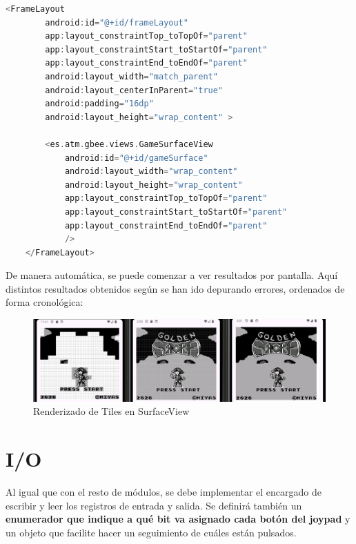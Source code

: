 \begin{lstlisting}[language=Kotlin, caption={GameSurfaceView en Layout.}, label={code:surfacelayout}]
    <FrameLayout
        android:id="@+id/frameLayout"
        app:layout_constraintTop_toTopOf="parent"
        app:layout_constraintStart_toStartOf="parent"
        app:layout_constraintEnd_toEndOf="parent"
        android:layout_width="match_parent"
        android:layout_centerInParent="true"
        android:padding="16dp"
        android:layout_height="wrap_content" >

        <es.atm.gbee.views.GameSurfaceView
            android:id="@+id/gameSurface"
            android:layout_width="wrap_content"
            android:layout_height="wrap_content"
            app:layout_constraintTop_toTopOf="parent"
            app:layout_constraintStart_toStartOf="parent"
            app:layout_constraintEnd_toEndOf="parent"
            />
    </FrameLayout>
\end{lstlisting}
\clearpage
De manera automática, se puede comenzar a ver resultados por pantalla. Aquí distintos resultados obtenidos según se han ido depurando errores, ordenados de forma cronológica:

\begin{figure}[H]
    \centering
    \includegraphics[width=1\textwidth]{include/images/render_surface_view.png}
    \caption{Renderizado de Tiles en SurfaceView}\label{figure:surface_view}
\end{figure}

\section{I/O}

Al igual que con el resto de módulos, se debe implementar el encargado de escribir y leer los registros de entrada y salida. Se definirá también un \textbf{enumerador que indique a qué bit va asignado cada botón del joypad} y un objeto que facilite hacer un seguimiento de cuáles están pulsados.

